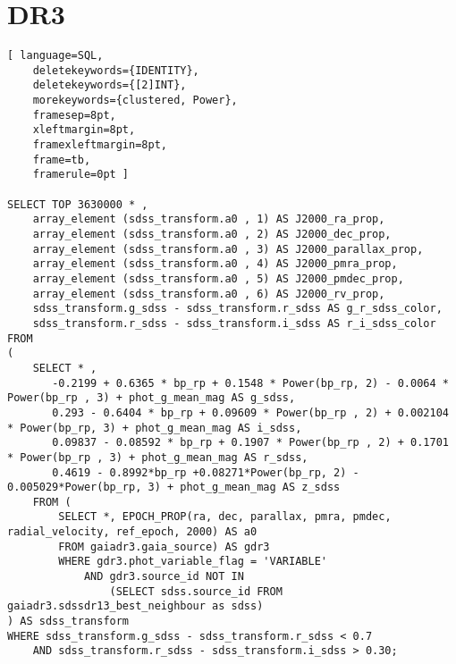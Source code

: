 \section{DR3} \label{apendice:gaiaAdql:dr3}
\begin{lstlisting}[ language=SQL,
	deletekeywords={IDENTITY},
	deletekeywords={[2]INT},
	morekeywords={clustered, Power},
	framesep=8pt,
	xleftmargin=8pt,
	framexleftmargin=8pt,
	frame=tb,
	framerule=0pt ]

SELECT TOP 3630000 * ,
	array_element (sdss_transform.a0 , 1) AS J2000_ra_prop,
	array_element (sdss_transform.a0 , 2) AS J2000_dec_prop,
	array_element (sdss_transform.a0 , 3) AS J2000_parallax_prop,
	array_element (sdss_transform.a0 , 4) AS J2000_pmra_prop,
	array_element (sdss_transform.a0 , 5) AS J2000_pmdec_prop,
	array_element (sdss_transform.a0 , 6) AS J2000_rv_prop,
	sdss_transform.g_sdss - sdss_transform.r_sdss AS g_r_sdss_color,
	sdss_transform.r_sdss - sdss_transform.i_sdss AS r_i_sdss_color
FROM
(
	SELECT * ,
	   -0.2199 + 0.6365 * bp_rp + 0.1548 * Power(bp_rp, 2) - 0.0064 * Power(bp_rp , 3) + phot_g_mean_mag AS g_sdss,
	   0.293 - 0.6404 * bp_rp + 0.09609 * Power(bp_rp , 2) + 0.002104 * Power(bp_rp, 3) + phot_g_mean_mag AS i_sdss,
	   0.09837 - 0.08592 * bp_rp + 0.1907 * Power(bp_rp , 2) + 0.1701 * Power(bp_rp , 3) + phot_g_mean_mag AS r_sdss,
	   0.4619 - 0.8992*bp_rp +0.08271*Power(bp_rp, 2) - 0.005029*Power(bp_rp, 3) + phot_g_mean_mag AS z_sdss
	FROM (
		SELECT *, EPOCH_PROP(ra, dec, parallax, pmra, pmdec, radial_velocity, ref_epoch, 2000) AS a0
		FROM gaiadr3.gaia_source) AS gdr3
		WHERE gdr3.phot_variable_flag = 'VARIABLE'
			AND gdr3.source_id NOT IN
				(SELECT sdss.source_id FROM gaiadr3.sdssdr13_best_neighbour as sdss)
) AS sdss_transform
WHERE sdss_transform.g_sdss - sdss_transform.r_sdss < 0.7
	AND sdss_transform.r_sdss - sdss_transform.i_sdss > 0.30;

\end{lstlisting}